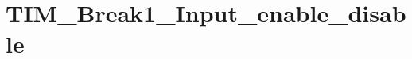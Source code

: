 \hypertarget{group___t_i_m___break1___input__enable__disable}{\section{T\-I\-M\-\_\-\-Break1\-\_\-\-Input\-\_\-enable\-\_\-disable}
\label{group___t_i_m___break1___input__enable__disable}
}
